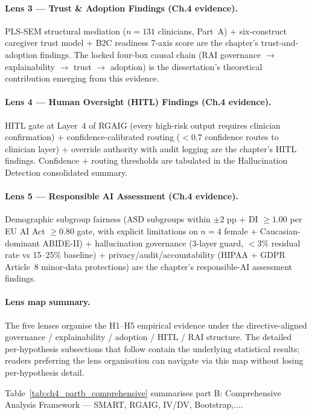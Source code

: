 \paragraph{Lens 3 --- Trust \& Adoption Findings (Ch.4 evidence).}
PLS-SEM structural mediation ($n = 131$ clinicians, Part~A) + six-construct caregiver trust model + B2C readiness 7-axis score are the chapter's trust-and-adoption findings. The locked four-box causal chain (RAI governance $\to$ explainability $\to$ trust $\to$ adoption) is the dissertation's theoretical contribution emerging from this evidence.

\paragraph{Lens 4 --- Human Oversight (HITL) Findings (Ch.4 evidence).}
HITL gate at Layer~4 of RGAIG (every high-risk output requires clinician confirmation) + confidence-calibrated routing ($< 0.7$ confidence routes to clinician layer) + override authority with audit logging are the chapter's HITL findings. Confidence + routing thresholds are tabulated in the Hallucination Detection consolidated summary.

\paragraph{Lens 5 --- Responsible AI Assessment (Ch.4 evidence).}
Demographic subgroup fairness (ASD subgroups within $\pm 2$ pp + DI $\geq 1.00$ per EU AI Act $\geq 0.80$ gate, with explicit limitations on $n = 4$ female + Caucasian-dominant ABIDE-II) + hallucination governance (3-layer guard, $< 3$\% residual rate vs 15--25\% baseline) + privacy/audit/accountability (HIPAA + GDPR Article~8 minor-data protections) are the chapter's responsible-AI assessment findings.

\paragraph{Lens map summary.} The five lenses organise the H1--H5 empirical evidence under the directive-aligned governance / explainability / adoption / HITL / RAI structure. The detailed per-hypothesis subsections that follow contain the underlying statistical results; readers preferring the lens organisation can navigate via this map without losing per-hypothesis detail.

\noindent Table~\ref{tab:ch4_partb_comprehensive} summarises part B: Comprehensive Analysis Framework --- SMART, RGAIG, IV/DV, Bootstrap,....

